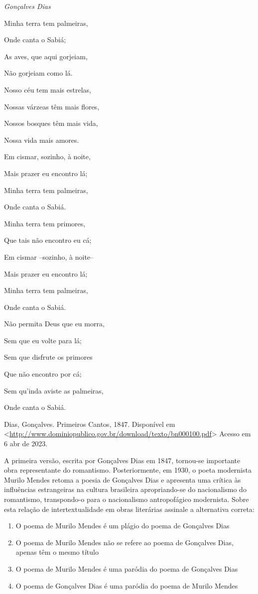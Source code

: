 {{\begin{escolha}
\emph{Gonçalves Dias}

Minha terra tem palmeiras,

Onde canta o Sabiá;

As aves, que aqui gorjeiam,

Não gorjeiam como lá.

Nosso céu tem mais estrelas,

Nossas várzeas têm mais flores,

Nossos bosques têm mais vida,

Nossa vida mais amores.

Em cismar, sozinho, à noite,

Mais prazer eu encontro lá;

Minha terra tem palmeiras,

Onde canta o Sabiá.

Minha terra tem primores,

Que tais não encontro eu cá;

Em cismar --sozinho, à noite--

Mais prazer eu encontro lá;

Minha terra tem palmeiras,

Onde canta o Sabiá.

Não permita Deus que eu morra,

Sem que eu volte para lá;

Sem que disfrute os primores

Que não encontro por cá;

Sem qu'inda aviste as palmeiras,

Onde canta o Sabiá.

Dias, Gonçalves. Primeiros Cantos, 1847. Disponível em
\textless{}\href{http://www.dominiopublico.gov.br/download/texto/bn000100.pdf}{\uline{http://www.dominiopublico.gov.br/download/texto/bn000100.pdf}}\textgreater{}
Acesso em 6 abr de 2023.

A primeira versão, escrita por Gonçalves Dias em 1847, tornou-se
importante obra representante do romantismo. Posteriormente, em 1930, o
poeta modernista Murilo Mendes retoma a poesia de Gonçalves Dias e
apresenta uma crítica às influências estrangeiras na cultura brasileira
apropriando-se do nacionalismo do romantismo, transpondo-o para o
nacionalismo antropofágico modernista. Sobre esta relação de
intertextualidade em obras literárias assinale a alternativa correta:

\begin{enumerate}
\def\labelenumi{\alph{enumi})}
\item
  O poema de Murilo Mendes é um plágio do poema de Gonçalves Dias
\item
  O poema de Murilo Mendes não se refere ao poema de Gonçalves Dias,
  apenas têm o mesmo título
\item
  O poema de Murilo Mendes é uma paródia do poema de Gonçalves Dias
\item
  O poema de Gonçalves Dias é uma paródia do poema de Murilo Mendes
\end{enumerate}


\end{escolha}}}
